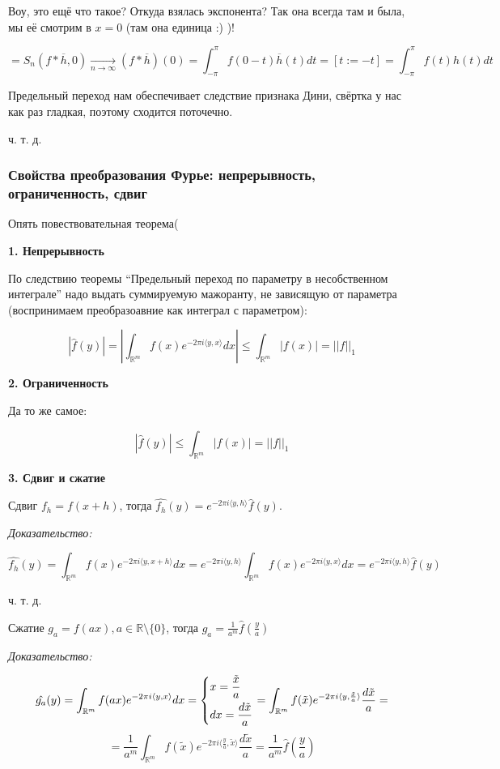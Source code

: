 \documentclass{article}
\def\goesto#1{\underset{#1}{\longrightarrow}}
\def\toinf#1{\goesto{#1 \rightarrow \infty}}
\def\ntoinf{\toinf{n}}
\def\sk#1#2{\langle #1, #2 \rangle}
\begin{document}
Воу, это ещё что такое? Откуда взялась экспонента? Так она всегда там и была, мы её смотрим в $x = 0$ (там она единица :) )!

\[ = S_n(f * \overline{h}, 0) \ntoinf (f * \overline{h})(0) = \int_{-\pi}^{\pi} f (0 - t)\overline{h}(t) dt = [t := -t] = \int_{-\pi}^{\pi} f(t)h(t) dt\]

Предельный переход нам обеспечивает следствие признака Дини, свёртка у нас как раз гладкая, поэтому сходится поточечно.  

ч. т. д. 

\subsubsection{Свойства преобразования Фурье: непрерывность, ограниченность, сдвиг}

Опять повествовательная теорема(

\textbf{1. Непрерывность}

По следствию теоремы ``Предельный переход по параметру в несобственном интеграле'' надо выдать суммируемую мажоранту, не зависящую от параметра (воспринимаем преобразоавние как интеграл с параметром):

\[|\hat{f}(y)| = \left| \int_{\mathbb{R}^m} f(x) e^{-2\pi i\sk{y}{x}}dx\right| \le \int_{\mathbb{R}^m} |f(x)| = ||f||_1\]

\textbf{2. Ограниченность}

Да то же самое:

\[|\hat{f}(y)| \le \int_{\mathbb{R}^m} |f(x)| = ||f||_1\]

\textbf{3. Сдвиг и сжатие}

Сдвиг $f_h = f(x + h)$, тогда $\hat{f_h}(y) = e^{-2 \pi i \sk{y}{h}} \hat{f}(y)$.

\textit{Доказательство:}

\[\hat{f_h}(y) = \int_{\mathbb{R}^m}f(x)e^{-2 \pi i \sk{y}{x + h}}dx = e^{-2\pi i \sk{y}{h}}\int_{\mathbb{R}^m}f(x)e^{-2 \pi i \sk{y}{x}}dx = e^{-2\pi i \sk{y}{h}} \hat{f}(y)\]

ч. т. д.

Сжатие $g_a = f(ax), a \in \mathbb{R} \setminus \{0\}$, тогда $\hat{g_a} = \frac{1}{a^m} \hat{f}\left(\frac{y}{a}\right)$

\textit{Доказательство:}

\[\hat{g_a}(y) = \int_{\mathbb{R}^m}f(ax)e^{-2 \pi i \sk{y}{x}}dx = \begin{dcases}
x = \frac{\tilde{x}}{a}\\
dx = \frac{d\tilde{x}}{a}
\end{dcases} = \int_{\mathbb{R}^m}f(\tilde{x})e^{-2 \pi i \sk{y}{\frac{\tilde{x}}{a}}}\frac{d\tilde{x}}{a} = \]
\[ = \frac{1}{a^m} \int_{\mathbb{R}^m}f(\tilde{x})e^{-2 \pi i \sk{\frac{y}{a}}{\tilde{x}}}\frac{d\tilde{x}}{a} = \frac{1}{a^m}\hat{f}\left(\frac{y}{a}\right)\]
\end{document}
